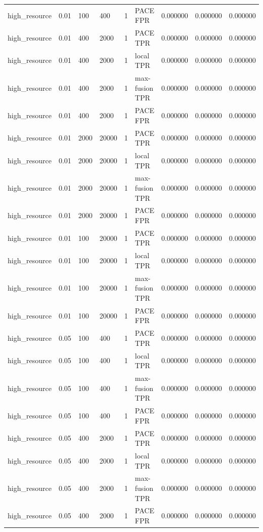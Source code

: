\begin{tabular}{lllllllll}
high\_resource & 0.01 & 100 & 400 & 1 & PACE FPR & 0.000000 & 0.000000 & 0.000000 \\
high\_resource & 0.01 & 400 & 2000 & 1 & PACE TPR & 0.000000 & 0.000000 & 0.000000 \\
high\_resource & 0.01 & 400 & 2000 & 1 & local TPR & 0.000000 & 0.000000 & 0.000000 \\
high\_resource & 0.01 & 400 & 2000 & 1 & max-fusion TPR & 0.000000 & 0.000000 & 0.000000 \\
high\_resource & 0.01 & 400 & 2000 & 1 & PACE FPR & 0.000000 & 0.000000 & 0.000000 \\
high\_resource & 0.01 & 2000 & 20000 & 1 & PACE TPR & 0.000000 & 0.000000 & 0.000000 \\
high\_resource & 0.01 & 2000 & 20000 & 1 & local TPR & 0.000000 & 0.000000 & 0.000000 \\
high\_resource & 0.01 & 2000 & 20000 & 1 & max-fusion TPR & 0.000000 & 0.000000 & 0.000000 \\
high\_resource & 0.01 & 2000 & 20000 & 1 & PACE FPR & 0.000000 & 0.000000 & 0.000000 \\
high\_resource & 0.01 & 100 & 20000 & 1 & PACE TPR & 0.000000 & 0.000000 & 0.000000 \\
high\_resource & 0.01 & 100 & 20000 & 1 & local TPR & 0.000000 & 0.000000 & 0.000000 \\
high\_resource & 0.01 & 100 & 20000 & 1 & max-fusion TPR & 0.000000 & 0.000000 & 0.000000 \\
high\_resource & 0.01 & 100 & 20000 & 1 & PACE FPR & 0.000000 & 0.000000 & 0.000000 \\
high\_resource & 0.05 & 100 & 400 & 1 & PACE TPR & 0.000000 & 0.000000 & 0.000000 \\
high\_resource & 0.05 & 100 & 400 & 1 & local TPR & 0.000000 & 0.000000 & 0.000000 \\
high\_resource & 0.05 & 100 & 400 & 1 & max-fusion TPR & 0.000000 & 0.000000 & 0.000000 \\
high\_resource & 0.05 & 100 & 400 & 1 & PACE FPR & 0.000000 & 0.000000 & 0.000000 \\
high\_resource & 0.05 & 400 & 2000 & 1 & PACE TPR & 0.000000 & 0.000000 & 0.000000 \\
high\_resource & 0.05 & 400 & 2000 & 1 & local TPR & 0.000000 & 0.000000 & 0.000000 \\
high\_resource & 0.05 & 400 & 2000 & 1 & max-fusion TPR & 0.000000 & 0.000000 & 0.000000 \\
high\_resource & 0.05 & 400 & 2000 & 1 & PACE FPR & 0.000000 & 0.000000 & 0.000000 \\

\end{tabular}
